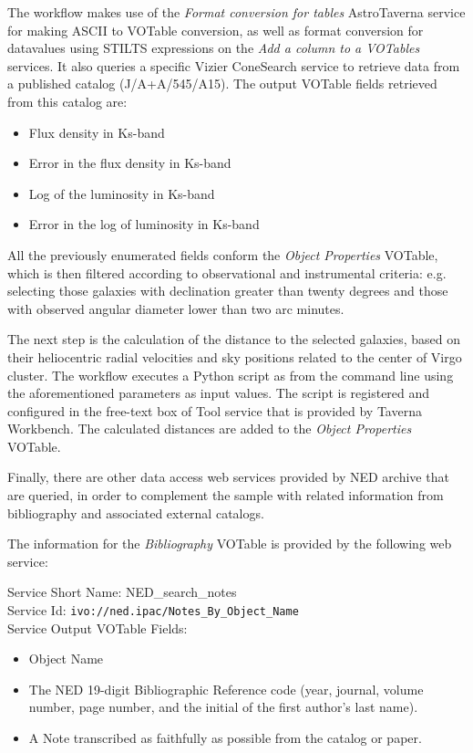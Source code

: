 \documentclass{aa}
\begin{document}
The workflow makes use of the \textit{Format conversion for tables} AstroTaverna service for making ASCII to VOTable conversion, as well as format conversion for datavalues using STILTS expressions on the \textit{Add a column to a VOTables} services. It also queries a specific Vizier ConeSearch service to retrieve data from a published catalog (J/A+A/545/A15). The output VOTable fields retrieved from this catalog are:

\begin{itemize}
\item Flux density in Ks-band 
\item Error in the flux density in Ks-band
\item Log of the luminosity in Ks-band
\item Error in the log of luminosity in Ks-band
\end{itemize}

All the previously enumerated fields conform the \textit{Object Properties} VOTable, which is then filtered according to observational and instrumental criteria: e.g. selecting those galaxies with declination greater than twenty degrees and those with observed angular diameter lower than two arc minutes. 

The next step is the calculation of the distance to the selected galaxies, based on their heliocentric radial velocities and sky positions related to the center of Virgo cluster. The workflow executes a Python script as from the command line using the aforementioned parameters as input values. The script is registered and configured in the free-text box of Tool service that is provided by Taverna Workbench. The calculated distances are added to the \textit{Object Properties} VOTable. 

Finally, there are other data access web services provided by NED archive that are queried, in order to complement the sample with related information from bibliography and associated external catalogs. 

The information for the \textit{Bibliography} VOTable is provided by the following web service:

\begin{minipage}[h]{0.9\columnwidth}
  \small \vspace{\baselineskip}
\noindent Service Short Name: NED\_search\_notes\\
Service Id: \texttt{ivo://ned.ipac/Notes\_By\_Object\_Name}\\
Service Output VOTable Fields:
\begin{itemize}
\item Object Name
\item The NED 19-digit Bibliographic Reference code (year, journal, volume number, page number, and the initial of the first author's last name).
\item A Note transcribed as faithfully as possible from the catalog or paper.
\end{itemize}
\vspace{\baselineskip}
\end{minipage}
\end{document}
